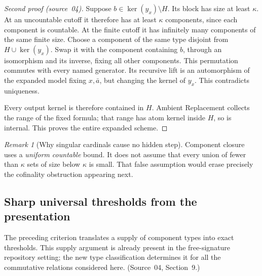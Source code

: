 \documentclass[11pt,letterpaper]{article}
\numberwithin{equation}{section}
\theoremstyle{plain}
\theoremstyle{definition}
\theoremstyle{remark}
\newtheorem{remark}[remark]{Remark}
\newcommand{\kerat}{\operatorname{ker}}
\newcommand{\srcs}[1]{\par\noindent{\footnotesize\textit{Sources:} #1}\par}
\begin{document}
\begin{proof}[Second proof (source~04)]
Suppose $b\in\kerat(y_x)\setminus H$.
Its block has size at least $\kappa$.
At an uncountable cutoff it therefore has at least
$\kappa$ components, since each component is countable.
At the finite cutoff it has infinitely many components
of the same finite size. Choose a component of the same
type disjoint from $H\cup\kerat(y_x)$.
Swap it with the component containing $b$, through an
isomorphism and its inverse, fixing all other components.
This permutation commutes with every named generator.
Its recursive lift is an automorphism of the expanded
model fixing $x,\bar a$, but changing the kernel of
$y_x$. This contradicts uniqueness.

Every output kernel is therefore contained in $H$.
Ambient Replacement collects the range of the fixed
formula; that range has atom kernel inside $H$, so is
internal. This proves the entire expanded scheme.
\end{proof}

\begin{remark}[Why singular cardinals cause no hidden step]\label{nee:ci:rem:singular}
Component closure uses a \emph{uniform countable} bound.
It does not assume that every union of fewer than
$\kappa$ sets of size below $\kappa$ is small.
That false assumption would erase precisely the
cofinality obstruction appearing next.
\end{remark}
\srcs{source~04, Remark~8.2.}

\subsection{Sharp universal thresholds from the presentation}

The preceding criterion translates a supply of component
types into exact thresholds. This supply argument is
already present in the free-signature repository setting;
the new type classification determines it for all the
commutative relations considered here. (Source~04, Section~9.)
\end{document}
